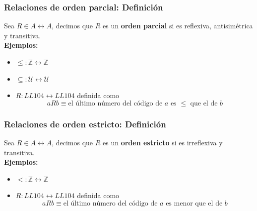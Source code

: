 \documentclass{beamer}
\begin{document}
\begin{frame}[fragile]
    \frametitle{Relaciones de orden parcial: Definición}
    Sea $R \in A \leftrightarrow A$, decimos que $R$ es un \textbf{orden parcial} si es reflexiva, antisimétrica y transitiva.\\
    \textbf{Ejemplos:}
    \begin{itemize}
        \item $\leq: \mathbb{Z} \leftrightarrow \mathbb{Z}$  
        \item $\subseteq: \mathcal{U} \leftrightarrow \mathcal{U}$  
        \item $R : LL104 \leftrightarrow LL104$ definida como
            $$aRb \equiv \text{el último número del código de $a$ es $\leq$ que el de $b$}$$
    \end{itemize}
\end{frame}

\begin{frame}[fragile]
    \frametitle{Relaciones de orden estricto: Definición}
    Sea $R \in A \leftrightarrow A$, decimos que $R$ es un \textbf{orden estricto} si es irreflexiva y transitiva.\\
    \textbf{Ejemplos:}
    \begin{itemize}
        \item $<: \mathbb{Z} \leftrightarrow \mathbb{Z}$  
        \item $R : LL104 \leftrightarrow LL104$ definida como
            $$aRb \equiv \text{el último número del código de $a$ es menor que el de $b$}$$
    \end{itemize}
\end{frame}
\end{document}
